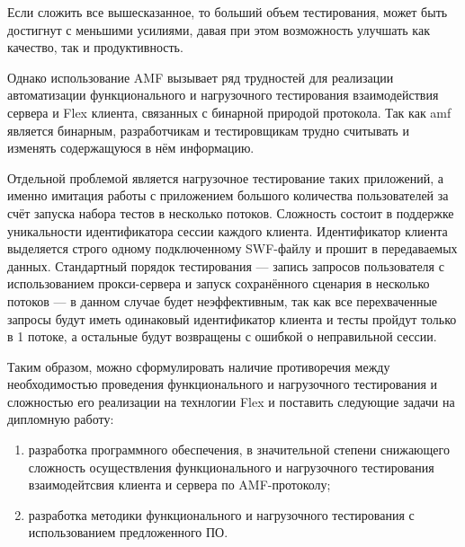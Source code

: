Если сложить все вышесказанное, то больший объем тестирования, может быть
достигнут с меньшими усилиями, давая при этом возможность улучшать как качество, 
так и продуктивность\cite{testing}.

Однако использование AMF вызывает ряд трудностей для реализации автоматизации функционального 
и нагрузочного тестирования взаимодействия сервера и Flex клиента, связанных с бинарной 
природой протокола. Так как amf является бинарным,
разработчикам и тестировщикам трудно считывать и изменять содержащуюся в нём информацию.

Отдельной проблемой является нагрузочное тестирование таких приложений, а именно имитация работы с
приложением большого количества пользователей за счёт запуска набора тестов в несколько потоков. 
Сложность состоит в поддержке уникальности идентификатора сессии каждого клиента. Идентификатор 
клиента выделяется строго одному подключенному SWF-файлу и прошит в передаваемых данных.
Стандартный порядок тестирования --- запись запросов пользователя с использованием прокси-сервера
и запуск сохранённого сценария в несколько потоков --- в данном случае будет неэффективным, так
как все перехваченные запросы будут иметь одинаковый идентификатор клиента и тесты пройдут
только в 1 потоке, а остальные будут возвращены с ошибкой о неправильной сессии.
 
Таким образом, можно сформулировать наличие противоречия между необходимостью проведения функционального
и нагрузочного тестирования и сложностью его реализации на технлогии Flex и поставить следующие задачи на 
дипломную работу:

\begin{enumerate}
\item разработка программного обеспечения, в значительной степени снижающего сложность осуществления функционального
и нагрузочного тестирования взаимодейтсвия клиента и сервера по AMF-протоколу;
\item разработка методики функционального и нагрузочного тестирования с использованием предложенного ПО.
\end{enumerate}